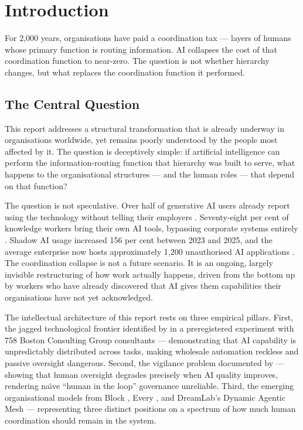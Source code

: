 \chapter{Introduction}
\label{ch:introduction}

\epigraph{For 2,000 years, organisations have paid a coordination tax --- layers of humans whose primary function is routing information. AI collapses the cost of that coordination function to near-zero. The question is not whether hierarchy changes, but what replaces the coordination function it performed.}{}

\section{The Central Question}

This report addresses a structural transformation that is already underway in organisations worldwide, yet remains poorly understood by the people most affected by it. The question is deceptively simple: if artificial intelligence can perform the information-routing function that hierarchy was built to serve, what happens to the organisational structures --- and the human roles --- that depend on that function?

The question is not speculative. Over half of generative AI users already report using the technology without telling their employers \parencite{Mollick2023SecretCyborgs}. Seventy-eight per cent of knowledge workers bring their own AI tools, bypassing corporate systems entirely \parencite{MicrosoftWorkTrend2024}. Shadow AI usage increased 156 per cent between 2023 and 2025, and the average enterprise now hosts approximately 1,200 unauthorised AI applications \parencite{IBM2025}. The coordination collapse is not a future scenario. It is an ongoing, largely invisible restructuring of how work actually happens, driven from the bottom up by workers who have already discovered that AI gives them capabilities their organisations have not yet acknowledged.

The intellectual architecture of this report rests on three empirical pillars. First, the jagged technological frontier identified by \textcite{DellAcqua2026} in a preregistered experiment with 758 Boston Consulting Group consultants --- demonstrating that AI capability is unpredictably distributed across tasks, making wholesale automation reckless and passive oversight dangerous. Second, the vigilance problem documented by \textcite{DellAcqua2023} --- showing that human oversight degrades precisely when AI quality improves, rendering na\"{\i}ve ``human in the loop'' governance unreliable. Third, the emerging organisational models from Block \parencite{DorseyBotha2026}, Every \parencite{Shipper2026}, and DreamLab's Dynamic Agentic Mesh --- representing three distinct positions on a spectrum of how much human coordination should remain in the system.

